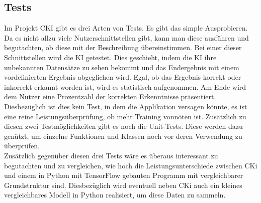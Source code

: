 \subsection{Tests}
\label{sec:DesignTests}
Im Projekt CKI gibt es drei Arten von Tests. Es gibt das simple Ausprobieren. Da es nicht allzu viele Nutzerschnittstellen gibt, kann man diese ausführen und begutachten, ob diese mit der Beschreibung übereinstimmen.
Bei einer dieser Schnittstellen wird die KI getestet. Dies geschieht, indem die KI ihre unbekannten Datensätze zu sehen bekommt und das Endergebnis mit einem vordefinierten Ergebnis abgeglichen wird.
Egal, ob das Ergebnis korrekt oder inkorrekt erkannt worden ist, wird es statistisch aufgenommen. Am Ende wird dem Nutzer eine Prozentzahl der korrekten Erkenntnisse präsentiert. Diesbezüglich ist dies kein Test, in dem die Applikation versagen könnte, es ist eine reine Leistungsüberprüfung, ob mehr Training vonnöten ist.
Zusätzlich zu diesen zwei Testmöglichkeiten gibt es noch die Unit-Tests. Diese werden dazu genützt, um einzelne Funktionen und Klassen noch vor deren Verwendung zu überprüfen.
\\
Zusätzlich gegenüber diesen drei Tests wäre es überaus interessant zu begutachten und zu vergleichen, wie hoch die Leistungsunterschiede zwischen CKi und einem in Python mit TensorFlow gebauten Programm mit vergleichbarer Grundstruktur sind. Diesbezüglich wird eventuell neben CKi auch ein kleines vergleichbares Modell in Python realisiert, um diese Daten zu sammeln.
